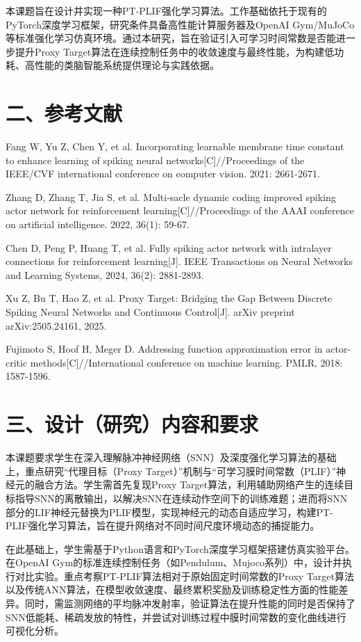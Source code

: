 \documentclass[UTF8,12pt,a4paper]{ctexart}
\begin{document}
本课题旨在设计并实现一种PT-PLIF强化学习算法。工作基础依托于现有的PyTorch深度学习框架，研究条件具备高性能计算服务器及OpenAI Gym/MuJoCo等标准强化学习仿真环境。通过本研究，旨在验证引入可学习时间常数是否能进一步提升Proxy Target算法在连续控制任务中的收敛速度与最终性能，为构建低功耗、高性能的类脑智能系统提供理论与实践依据。

\section*{二、参考文献}
\begin{enumerate}[label={[\arabic*]},leftmargin=2.7em,itemsep=0.2em]
  \item Fang W, Yu Z, Chen Y, et al. Incorporating learnable membrane time constant to enhance learning of spiking neural networks[C]//Proceedings of the IEEE/CVF international conference on computer vision. 2021: 2661-2671.
  \item Zhang D, Zhang T, Jia S, et al. Multi-sacle dynamic coding improved spiking actor network for reinforcement learning[C]//Proceedings of the AAAI conference on artificial intelligence. 2022, 36(1): 59-67.
  \item Chen D, Peng P, Huang T, et al. Fully spiking actor network with intralayer connections for reinforcement learning[J]. IEEE Transactions on Neural Networks and Learning Systems, 2024, 36(2): 2881-2893.
  \item Xu Z, Bu T, Hao Z, et al. Proxy Target: Bridging the Gap Between Discrete Spiking Neural Networks and Continuous Control[J]. arXiv preprint arXiv:2505.24161, 2025.
  \item Fujimoto S, Hoof H, Meger D. Addressing function approximation error in actor-critic methods[C]//International conference on machine learning. PMLR, 2018: 1587-1596.
\end{enumerate}

\section*{三、设计（研究）内容和要求}
本课题要求学生在深入理解脉冲神经网络（SNN）及深度强化学习算法的基础上，重点研究“代理目标（Proxy Target）”机制与“可学习膜时间常数（PLIF）”神经元的融合方法。学生需首先复现Proxy Target算法，利用辅助网络产生的连续目标指导SNN的离散输出，以解决SNN在连续动作空间下的训练难题；进而将SNN部分的LIF神经元替换为PLIF模型，实现神经元的动态自适应学习，构建PT-PLIF强化学习算法，旨在提升网络对不同时间尺度环境动态的捕捉能力。

在此基础上，学生需基于Python语言和PyTorch深度学习框架搭建仿真实验平台。在OpenAI Gym的标准连续控制任务（如Pendulum、Mujoco系列）中，设计并执行对比实验。重点考察PT-PLIF算法相对于原始固定时间常数的Proxy Target算法以及传统ANN算法，在模型收敛速度、最终累积奖励及训练稳定性方面的性能差异。同时，需监测网络的平均脉冲发射率，验证算法在提升性能的同时是否保持了SNN低能耗、稀疏发放的特性，并尝试对训练过程中膜时间常数的变化曲线进行可视化分析。
\end{document}
